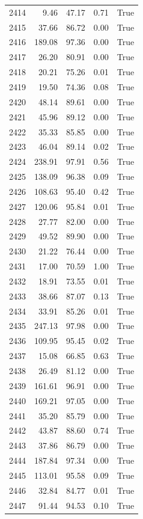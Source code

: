 \begin{longtable}{rrrrr}
2414 & 9.46 & 47.17 & 0.71 & True \\
2415 & 37.66 & 86.72 & 0.00 & True \\
2416 & 189.08 & 97.36 & 0.00 & True \\
2417 & 26.20 & 80.91 & 0.00 & True \\
2418 & 20.21 & 75.26 & 0.01 & True \\
2419 & 19.50 & 74.36 & 0.08 & True \\
2420 & 48.14 & 89.61 & 0.00 & True \\
2421 & 45.96 & 89.12 & 0.00 & True \\
2422 & 35.33 & 85.85 & 0.00 & True \\
2423 & 46.04 & 89.14 & 0.02 & True \\
2424 & 238.91 & 97.91 & 0.56 & True \\
2425 & 138.09 & 96.38 & 0.09 & True \\
2426 & 108.63 & 95.40 & 0.42 & True \\
2427 & 120.06 & 95.84 & 0.01 & True \\
2428 & 27.77 & 82.00 & 0.00 & True \\
2429 & 49.52 & 89.90 & 0.00 & True \\
2430 & 21.22 & 76.44 & 0.00 & True \\
2431 & 17.00 & 70.59 & 1.00 & True \\
2432 & 18.91 & 73.55 & 0.01 & True \\
2433 & 38.66 & 87.07 & 0.13 & True \\
2434 & 33.91 & 85.26 & 0.01 & True \\
2435 & 247.13 & 97.98 & 0.00 & True \\
2436 & 109.95 & 95.45 & 0.02 & True \\
2437 & 15.08 & 66.85 & 0.63 & True \\
2438 & 26.49 & 81.12 & 0.00 & True \\
2439 & 161.61 & 96.91 & 0.00 & True \\
2440 & 169.21 & 97.05 & 0.00 & True \\
2441 & 35.20 & 85.79 & 0.00 & True \\
2442 & 43.87 & 88.60 & 0.74 & True \\
2443 & 37.86 & 86.79 & 0.00 & True \\
2444 & 187.84 & 97.34 & 0.00 & True \\
2445 & 113.01 & 95.58 & 0.09 & True \\
2446 & 32.84 & 84.77 & 0.01 & True \\
2447 & 91.44 & 94.53 & 0.10 & True \\

\end{longtable}

